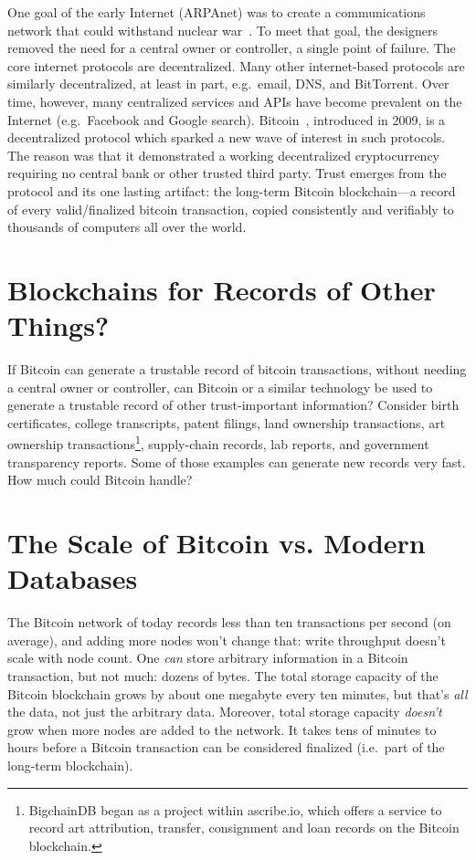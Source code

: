 \documentclass[a4paper]{article}
\begin{document}
One goal of the early Internet (ARPAnet) was to create a communications network
that could withstand nuclear war~\cite{arpanet_and_nuclear_war}.
To meet that goal, the designers removed the need for a central owner or
controller, a single point of failure.
The core internet protocols are decentralized.
Many other internet-based protocols are similarly decentralized,
at least in part, e.g.~email, DNS, and BitTorrent.
Over time, however, many centralized services and APIs have become
prevalent on the Internet (e.g.~Facebook and Google search).
Bitcoin~\cite{nakamoto2009bitcoin}, introduced in 2009,
is a decentralized protocol
which sparked a new wave of interest in such protocols.
The reason was that it demonstrated a working decentralized cryptocurrency
requiring no central bank or other trusted third party.
Trust emerges from the protocol and its one lasting artifact:
the long-term Bitcoin blockchain---a record
of every valid/finalized bitcoin transaction,
copied consistently and verifiably to thousands
of computers all over the world.


\section{Blockchains for Records of Other Things?}

If Bitcoin can generate a trustable record of bitcoin transactions,
without needing a central owner or controller,
can Bitcoin or a similar technology be used
to generate a trustable record of other trust-important information?
Consider
birth certificates,
college transcripts,
patent filings,
land ownership transactions,
art ownership transactions\footnote{BigchainDB
began as a project within ascribe.io,
which offers a service to record art attribution, transfer,
consignment and loan records on the Bitcoin blockchain.},
supply-chain records,
lab reports,
and
government transparency reports.
Some of those examples can
generate new records very fast.
How much could Bitcoin handle?


\section{The Scale of Bitcoin vs. Modern Databases}

The Bitcoin network of today records less than ten transactions per second (on average),
and adding more nodes won't change that: write throughput doesn't scale with node count.
One \emph{can} store arbitrary information in a Bitcoin transaction,
but not much: dozens of bytes.
The total storage capacity of the Bitcoin blockchain grows
by about one megabyte every ten minutes, but that's \emph{all} the data,
not just the arbitrary data.
Moreover, total storage capacity \emph{doesn't} grow when more nodes are added to the network.
It takes tens of minutes to hours before a Bitcoin transaction can be considered finalized
(i.e.~part of the long-term blockchain).
\end{document}
